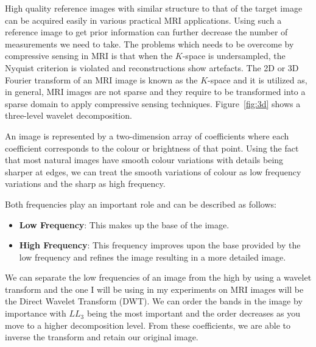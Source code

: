 \documentclass[titlepage,oneside, 12pt]{book}
\theoremstyle{break}
\begin{document}
High quality reference images with similar structure to that of the target image can be acquired easily in various practical MRI applications. Using such a reference image to get prior information can further decrease the number of measurements we need to take. The problems which needs to be overcome by compressive sensing in MRI is that when the $K$-space is undersampled, the Nyquist criterion is violated and reconstructions show artefacts. The 2D or 3D Fourier transform of an MRI image is known as the $K$-space and it is utilized as, in general, MRI images are not sparse and they require to be transformed into a sparse domain to apply compressive sensing techniques. Figure~\ref{fig:3d} shows a three-level wavelet decomposition. 

An image is represented by a two-dimension array of coefficients where each coefficient corresponds to the colour or brightness of that point. Using the fact that most natural images have smooth colour variations with details being sharper at edges, we can treat the smooth variations of colour as low frequency variations and the sharp as high frequency.

Both frequencies play an important role and can be described as follows:

\begin{itemize}
\item \textbf{Low Frequency}: This makes up the base of the image.
\item \textbf{High Frequency}: This frequency improves upon the base provided by the low frequency and refines the image resulting in a more detailed image. 
\end{itemize}

We can separate the low frequencies of an image from the high by using a wavelet transform and the one I will be using in my experiments on MRI images will be the Direct Wavelet Transform (DWT). We can order the bands in the image by importance with $LL_3$ being the most important and the order decreases as you move to a higher decomposition level. From these coefficients, we are able to inverse the transform and retain our original image.
\end{document}
